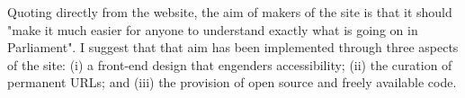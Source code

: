 Quoting directly from the website, the aim of makers of the site is that it should "make it much easier for anyone to understand exactly what is going on in Parliament".
I suggest that that aim has been implemented through three aspects of the site: (i) a front-end design that engenders accessibility; (ii) the curation of permanent URLs; and (iii)
the provision of open source and freely available code.